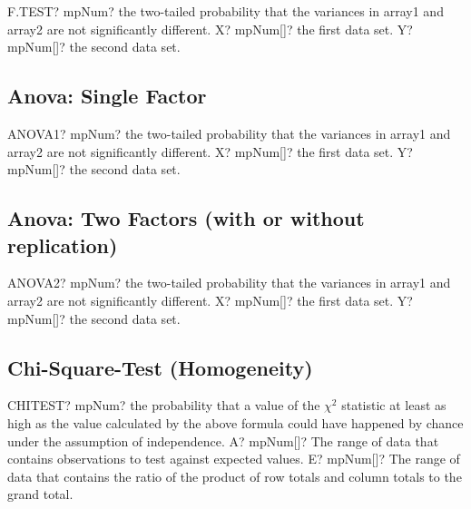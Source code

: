 \vspace{0.6cm}
\begin{mpFunctionsExtract}
	\mpWorksheetFunctionTwoNotImplemented
	{F.TEST? mpNum? the two-tailed probability that the variances in array1 and array2 are not significantly different.}
	{X? mpNum[]? the first data set.}
	{Y? mpNum[]? the second data set.}
\end{mpFunctionsExtract}




\subsection{Anova: Single Factor}
\label{kIndependentSamplesAnova}

\begin{mpFunctionsExtract}
	\mpFunctionTwoNotImplemented
	{ANOVA1? mpNum? the two-tailed probability that the variances in array1 and array2 are not significantly different.}
	{X? mpNum[]? the first data set.}
	{Y? mpNum[]? the second data set.}
\end{mpFunctionsExtract}



\subsection{Anova: Two Factors (with or without replication)}
\label{kCorrelatedSamplesAnova}

\begin{mpFunctionsExtract}
	\mpFunctionTwoNotImplemented
	{ANOVA2? mpNum? the two-tailed probability that the variances in array1 and array2 are not significantly different.}
	{X? mpNum[]? the first data set.}
	{Y? mpNum[]? the second data set.}
\end{mpFunctionsExtract}




\subsection{Chi-Square-Test (Homogeneity)}

\begin{mpFunctionsExtract}
	\mpWorksheetFunctionTwoNotImplemented
	{CHITEST? mpNum? the probability that a value of the $\chi^2$ statistic at least as high as the value calculated by the above formula could have happened by chance under the assumption of independence.}
	{A? mpNum[]? The range of data that contains observations to test against expected values.}
	{E? mpNum[]? The range of data that contains the ratio of the product of row totals and column totals to the grand total.}
\end{mpFunctionsExtract}

